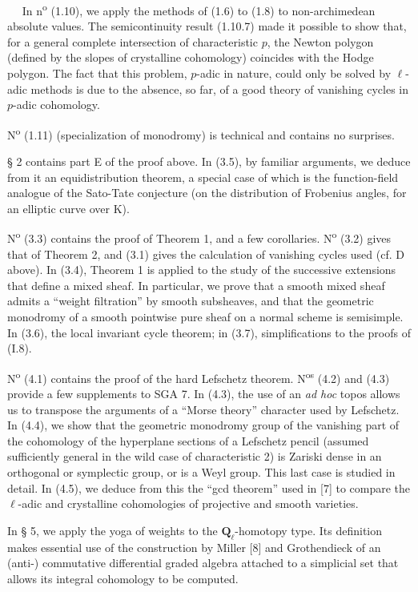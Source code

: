 \documentclass[11pt,leqno]{article}
\newcommand{\Page}[1]{\ifvmode\noindent\else\unskip\ \fi{\footnotesize\textcolor{gray}{[p.\,#1]}}\ \ignorespaces}
\begin{document}
\Page{143}
In n\textsuperscript{o} (1.10), we apply the methods of (1.6) to (1.8) to non-archimedean absolute values. The semicontinuity result (1.10.7) made it possible to show that, for a general complete intersection of characteristic \(p\), the Newton polygon (defined by the slopes of crystalline cohomology) coincides with the Hodge polygon. The fact that this problem, \(p\)-adic in nature, could only be solved by \(\ell\)-adic methods is due to the absence, so far, of a good theory of vanishing cycles in \(p\)-adic cohomology.

N\textsuperscript{o} (1.11) (specialization of monodromy) is technical and contains no surprises.

§ 2 contains part E of the proof above. In (3.5), by familiar arguments, we deduce from it an equidistribution theorem, a special case of which is the function-field analogue of the Sato-Tate conjecture (on the distribution of Frobenius angles, for an elliptic curve over \(\mathrm{K}\)).

N\textsuperscript{o} (3.3) contains the proof of Theorem 1, and a few corollaries. N\textsuperscript{o} (3.2) gives that of Theorem 2, and (3.1) gives the calculation of vanishing cycles used (cf. D above). In (3.4), Theorem 1 is applied to the study of the successive extensions that define a mixed sheaf. In particular, we prove that a smooth mixed sheaf admits a “weight filtration” by smooth subsheaves, and that the geometric monodromy of a smooth pointwise pure sheaf on a normal scheme is semisimple. In (3.6), the local invariant cycle theorem; in (3.7), simplifications to the proofs of (I.8).

N\textsuperscript{o} (4.1) contains the proof of the hard Lefschetz theorem. N\textsuperscript{os} (4.2) and (4.3) provide a few supplements to SGA 7. In (4.3), the use of an \textit{ad hoc} topos allows us to transpose the arguments of a “Morse theory” character used by Lefschetz. In (4.4), we show that the geometric monodromy group of the vanishing part of the cohomology of the hyperplane sections of a Lefschetz pencil (assumed sufficiently general in the wild case of characteristic 2) is Zariski dense in an orthogonal or symplectic group, or is a Weyl group. This last case is studied in detail. In (4.5), we deduce from this the “gcd theorem” used in [7] to compare the \(\ell\)-adic and crystalline cohomologies of projective and smooth varieties.

In § 5, we apply the yoga of weights to the \(\mathbf{Q}_\ell\)-homotopy type. Its definition makes essential use of the construction by Miller [8] and Grothendieck of an (anti-) commutative differential graded algebra attached to a simplicial set that allows its integral cohomology to be computed.
\end{document}
